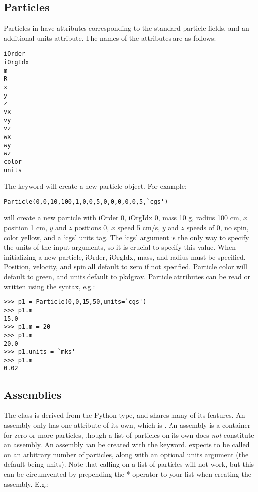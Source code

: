 \subsection{Particles}
Particles in  have attributes corresponding to the standard \pkd{} particle fields, and an additional units attribute. The names of the attributes are as follows:

\begin{verbatim}
iOrder
iOrgIdx
m
R
x
y
z
vx
vy
vz
wx
wy
wz
color
units
\end{verbatim}


\noindent The  keyword will create a new particle object. For example:
\begin{verbatim}
Particle(0,0,10,100,1,0,0,5,0,0,0,0,0,5,`cgs')
\end{verbatim}
will create a new particle with iOrder 0, iOrgIdx 0, mass 10 g, radius 100 cm, $x$ position 1 cm, $y$ and $z$ positions 0, $x$ speed 5 cm/s, $y$ and $z$ speeds of 0, no spin, color yellow, and a `cgs' units tag. The `cgs' argument is the only way to specify the units of the input arguments, so it is crucial to specify this value. When initializing a new particle, iOrder, iOrgIdx, mass, and radius must be specified. Position, velocity, and spin all default to zero if not specified. Particle color will default to green, and units default to pkdgrav. Particle attributes can be read or written using the  syntax, e.g.:

\begin{verbatim}
>>> p1 = Particle(0,0,15,50,units=`cgs')
>>> p1.m
15.0
>>> p1.m = 20
>>> p1.m
20.0
>>> p1.units = `mks'
>>> p1.m
0.02
\end{verbatim}


\subsection{Assemblies}
The  class is derived from the Python  type, and shares many of its features. An assembly only has one attribute of its own, which is . An assembly is a container for zero or more particles, though a list of particles on its own does \textit{not} constitute an assembly. An assembly can be created with the  keyword.  expects to be called on an arbitrary number of particles, along with an optional units argument (the default being \pkd{} units). Note that calling  on a list of particles will not work, but this can be circumvented by prepending the * operator to your list when creating the assembly. E.g.:

